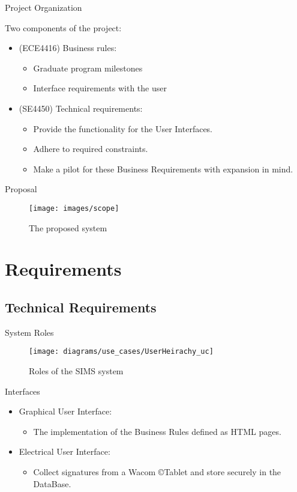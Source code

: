 \documentclass{beamer}
\begin{document}
\begin{frame}{Project Organization}

Two components of the project:
\begin{itemize}
\item
(ECE4416) Business rules:
\begin{itemize}
\item
Graduate program milestones
\item
Interface requirements with the user 
\end{itemize}
\item 
(SE4450) Technical requirements:
\begin{itemize}
\item
Provide the functionality for the User Interfaces.
\item 
Adhere to required constraints.
\item 
Make a pilot for these Business Requirements with expansion in mind. 
\end{itemize}
\end{itemize}



\end{frame}
\begin{frame}{Proposal}

\begin{figure}
\texttt{[image: images/scope]} \caption{ The proposed system }
\end{figure}

\end{frame}
\section{Requirements}

\subsection{Technical Requirements}

\begin{frame}{System Roles}
\begin{figure}[!h]
\texttt{[image: diagrams/use\_cases/UserHeirachy\_uc]} \caption{ Roles of the SIMS system } \label{fig:Users}
\end{figure}
\end{frame}

\begin{frame}{Interfaces}
\begin{itemize}
\item 
Graphical User Interface:
\begin{itemize}
\item 
The implementation of the Business Rules defined as HTML pages. 
\end{itemize}
\item 
Electrical User Interface:
	\begin{itemize}
	\item 
	Collect signatures from a Wacom \copyright Tablet and store securely in the DataBase.
	\end{itemize}
\end{itemize}
\end{frame}
\end{document}
